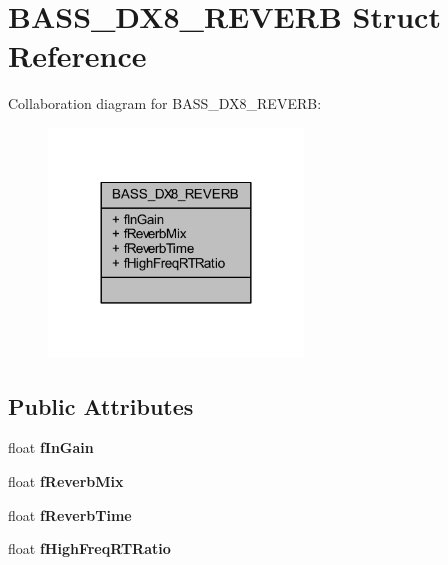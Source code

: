 \hypertarget{struct_b_a_s_s___d_x8___r_e_v_e_r_b}{\section{B\-A\-S\-S\-\_\-\-D\-X8\-\_\-\-R\-E\-V\-E\-R\-B Struct Reference}
\label{struct_b_a_s_s___d_x8___r_e_v_e_r_b}
}


Collaboration diagram for B\-A\-S\-S\-\_\-\-D\-X8\-\_\-\-R\-E\-V\-E\-R\-B\-:\nopagebreak
\begin{figure}[H]
\begin{center}
\leavevmode
\includegraphics[width=192pt]{struct_b_a_s_s___d_x8___r_e_v_e_r_b__coll__graph}
\end{center}
\end{figure}
\subsection*{Public Attributes}
\begin{DoxyCompactItemize}
\item 
\hypertarget{struct_b_a_s_s___d_x8___r_e_v_e_r_b_a3e6c02bdd61a3fae050c6a7f9318edd6_a3e6c02bdd61a3fae050c6a7f9318edd6}{float {\bfseries f\-In\-Gain}}\label{struct_b_a_s_s___d_x8___r_e_v_e_r_b_a3e6c02bdd61a3fae050c6a7f9318edd6_a3e6c02bdd61a3fae050c6a7f9318edd6}

\item 
\hypertarget{struct_b_a_s_s___d_x8___r_e_v_e_r_b_aaf55c48b1628fde8c6834fa5a223d807_aaf55c48b1628fde8c6834fa5a223d807}{float {\bfseries f\-Reverb\-Mix}}\label{struct_b_a_s_s___d_x8___r_e_v_e_r_b_aaf55c48b1628fde8c6834fa5a223d807_aaf55c48b1628fde8c6834fa5a223d807}

\item 
\hypertarget{struct_b_a_s_s___d_x8___r_e_v_e_r_b_adb97abb30a9a52c71e7a01d0b1c9b597_adb97abb30a9a52c71e7a01d0b1c9b597}{float {\bfseries f\-Reverb\-Time}}\label{struct_b_a_s_s___d_x8___r_e_v_e_r_b_adb97abb30a9a52c71e7a01d0b1c9b597_adb97abb30a9a52c71e7a01d0b1c9b597}

\item 
\hypertarget{struct_b_a_s_s___d_x8___r_e_v_e_r_b_ac19b8eddbad1b31e88ac508ccaa08a2d_ac19b8eddbad1b31e88ac508ccaa08a2d}{float {\bfseries f\-High\-Freq\-R\-T\-Ratio}}\label{struct_b_a_s_s___d_x8___r_e_v_e_r_b_ac19b8eddbad1b31e88ac508ccaa08a2d_ac19b8eddbad1b31e88ac508ccaa08a2d}

\end{DoxyCompactItemize}


